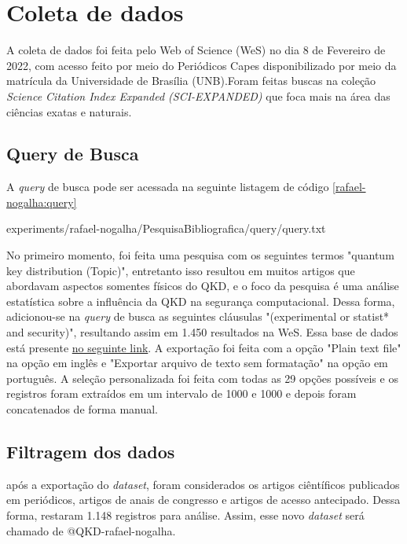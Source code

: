 \section{Coleta de dados}

A coleta de dados foi feita pelo Web of Science (WeS) no dia 8 de Fevereiro de 2022, com acesso feito por meio do Periódicos Capes disponibilizado por meio da matrícula da Universidade de Brasília (UNB).Foram feitas buscas na coleção \textit{Science Citation Index Expanded (SCI-EXPANDED)} que foca mais na área das ciências exatas e naturais. 

\subsection{Query de Busca}

A \textit{query} de busca pode ser acessada na seguinte listagem de código \ref{rafael-nogalha:query}


{experiments/rafael-nogalha/PesquisaBibliografica/query/query.txt}

No primeiro momento, foi feita uma pesquisa com os seguintes termos "quantum key distribution (Topic)", entretanto isso resultou em muitos artigos que abordavam aspectos somentes físicos do QKD, e o foco da pesquisa é uma análise estatística sobre a influência da QKD na segurança computacional. Dessa forma, adicionou-se na \textit{query} de busca as seguintes cláusulas "(experimental  or statist* and security)", resultando assim em 1.450 resultados na WeS. Essa base de dados está presente \href{https://github.com/jhcf/Comput-Experim-20212/tree/main/experiments/rafael-nogalha/PesquisaBibliografica/QKDSegurancaComputacional/dataset/dataset.txt}{no seguinte link}. A exportação foi feita com a opção "Plain text file" na opção em inglês e "Exportar arquivo de texto sem formatação" na opção em português. A seleção personalizada foi feita com todas as 29 opções possíveis e os registros foram extraídos em um intervalo de 1000 e 1000 e depois foram concatenados de forma manual.

\subsection{Filtragem dos dados}

após a exportação do \textit{dataset}, foram considerados os artigos ciêntíficos publicados em periódicos, artigos de anais de congresso e artigos de acesso antecipado. Dessa forma, restaram 1.148   registros para análise. Assim, esse novo \textit{dataset} será chamado de @QKD-rafael-nogalha.

